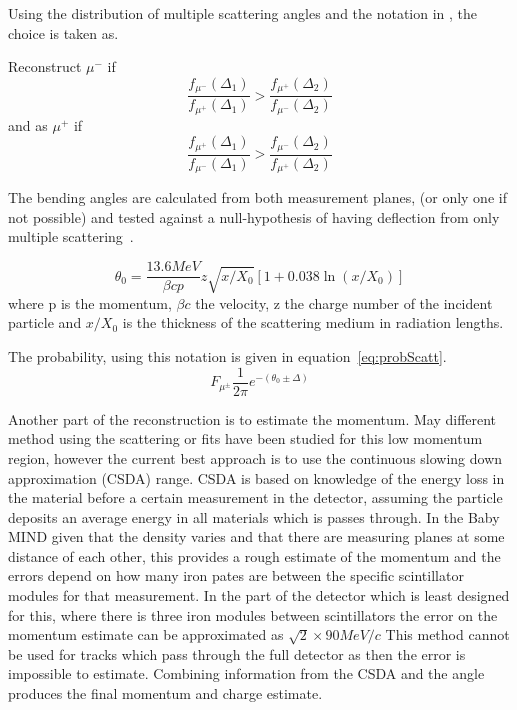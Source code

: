 Using the distribution of multiple scattering angles and the notation in , the choice is taken as. 

Reconstruct $\mu^-$ if 
\begin{equation}
\frac{f_{\mu^-}(\Delta_1)}{f_{\mu^+}(\Delta_1)} > \frac{f_{\mu^+}(\Delta_2)}{f_{\mu^-}(\Delta_2)}
\end{equation}
and as $\mu^+$ if
\begin{equation}
\frac{f_{\mu^+}(\Delta_1)}{f_{\mu^-}(\Delta_1)} > \frac{f_{\mu^-}(\Delta_2)}{f_{\mu^+}(\Delta_2)}
\end{equation}



The bending angles are calculated from both measurement planes, (or only one if not possible) and tested against a null-hypothesis of having deflection from only multiple scattering~\cite{13PDG}.

\begin{equation}
\theta_0 = \frac{13.6 MeV}{\beta cp} z \sqrt{x/X_0}[1+0.038\ln(x/X_0)]
\end{equation}
where p is the momentum, $\beta c$ the velocity, z the charge number of the incident particle and $x/X_0$ is the thickness of the scattering medium in radiation lengths.

The probability, using this notation is given in equation~\ref{eq:probScatt}.
\begin{equation}
F_{\mu^\pm} \frac{1}{2\pi} e ^ {-( \theta_0 \pm \Delta)}
\label{eq:probScatt}
\end{equation}

Another part of the reconstruction is to estimate the momentum. May different method using the scattering or fits have been studied for this low momentum region, however the current best approach is to use the continuous slowing down approximation (CSDA) range.
CSDA is based on knowledge of the energy loss in the material before a certain measurement in the detector, assuming the particle deposits an average energy in all materials which is passes through. In the Baby MIND given that the density varies and that there are measuring planes at some distance of each other, this provides a rough estimate of the momentum and the errors depend on how many iron pates are between the specific scintillator modules for that measurement. In the part of the detector which is least designed for this, where there is three iron modules between scintillators the error on the momentum estimate can be approximated as $\sqrt{2} \times 90 MeV/c$ This method cannot be used for tracks which pass through the full detector as then the error is impossible to estimate. Combining information from the CSDA and the angle produces the final momentum and charge estimate.


